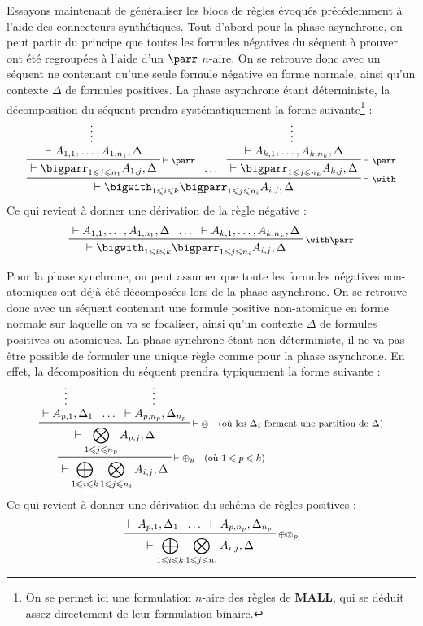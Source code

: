 \documentclass[11pt]{report}
\newcommand{\seq}{\vdash}
\newcommand{\irule}[1]{\footnotesize$#1$}
\newcommand{\iruleR}[1]{\irule{\seq{#1}}}
\begin{document}
Essayons maintenant de généraliser les blocs de règles évoqués précédemment à l'aide des connecteurs synthétiques. Tout d'abord pour la phase asynchrone, on peut partir du principe que toutes les formules négatives du séquent à prouver ont été regroupées à l'aide d'un $\parr$ $n$-aire. On se retrouve donc avec un séquent ne contenant qu'une seule formule négative en forme normale, ainsi qu'un contexte $\Delta$ de formules positives. La phase asynchrone étant déterministe, la décomposition du séquent prendra systématiquement la forme suivante\footnote{On se permet ici une formulation $n$-aire des règles de $\mathbf{MALL}$, qui se déduit assez directement de leur formulation binaire.} :
\begin{displaymath}
	\prftree[r]{\iruleR{\with}}
		{\prftree[r]{\iruleR{\parr}}
			{\prfsummary{\seq A_{1,1},\ldots,A_{1,n_1},\Delta}}
			{\seq \bigparr_{1 \leqslant j \leqslant n_1} A_{1,j},\Delta}}
		{\ldots}
		{\prftree[r]{\iruleR{\parr}}
			{\prfsummary{\seq A_{k,1},\ldots,A_{k,n_k},\Delta}}
			{\seq \bigparr_{1 \leqslant j \leqslant n_k} A_{k,j},\Delta}}
		{\seq \bigwith_{1 \leqslant i \leqslant k} \bigparr_{1 \leqslant j \leqslant n_i} A_{i,j},\Delta}
\end{displaymath}
Ce qui revient à donner une dérivation de la règle négative :
\begin{displaymath}
	\prftree[r]{\irule{\with\parr}}
		{\seq A_{1,1},\ldots,A_{1,n_1},\Delta}
		{\ldots}
		{\seq A_{k,1},\ldots,A_{k,n_k},\Delta}
		{\seq \bigwith_{1 \leqslant i \leqslant k} \bigparr_{1 \leqslant j \leqslant n_i} A_{i,j},\Delta}
\end{displaymath}

Pour la phase synchrone, on peut assumer que toute les formules négatives non-atomiques ont déjà été décomposées lors de la phase asynchrone. On se retrouve donc avec un séquent contenant une formule positive non-atomique en forme normale sur laquelle on va se focaliser, ainsi qu'un contexte $\Delta$ de formules positives ou atomiques. La phase synchrone étant non-déterministe, il ne va pas être possible de formuler une unique règle comme pour la phase asynchrone. En effet, la décomposition du séquent prendra typiquement la forme suivante :
\begin{displaymath}
	\prftree[r]{\iruleR{\oplus_p \quad (\text{où } 1 \leqslant p \leqslant k)}}
		{\prftree[r]{\iruleR{\otimes \quad (\text{où les } \Delta_i \text{ forment une partition de } \Delta)}}
			{\prfsummary{\seq A_{p,1},\Delta_1}}
			{\ldots}
			{\prfsummary{\seq A_{p,n_p},\Delta_{n_p}}}
			{\seq \bigotimes_{1 \leqslant j \leqslant n_p} A_{p,j},\Delta}}
		{\seq \bigoplus_{1 \leqslant i \leqslant k} \bigotimes_{1 \leqslant j \leqslant n_i} A_{i,j},\Delta}
\end{displaymath}
Ce qui revient à donner une dérivation du schéma de règles positives :
\begin{displaymath}
	\prftree[r]{\irule{\oplus\otimes_p}}
		{\seq A_{p,1},\Delta_1}
		{\ldots}
		{\seq A_{p,n_p},\Delta_{n_p}}
	{\seq \bigoplus_{1 \leqslant i \leqslant k} \bigotimes_{1 \leqslant j \leqslant n_i} A_{i,j},\Delta}
\end{displaymath}
\end{document}
